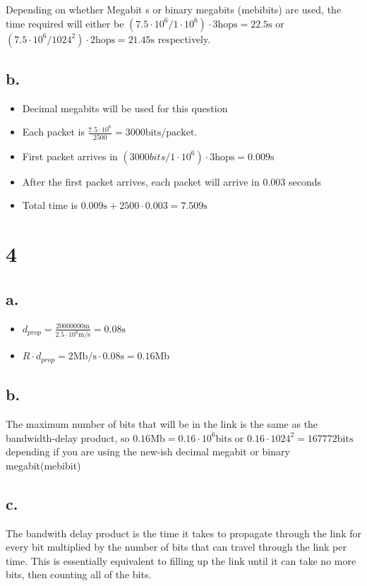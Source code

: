 \documentclass[11pt]{article}
\begin{document}
Depending on whether Megabit s or binary megabits (mebibits) are used, the time
required will either be \((7.5 \cdot 10^6 / 1 \cdot 10^6) \cdot 3 \text{hops} = 22.5 \text{s}\) or \((7.5 \cdot 10^6
/ 1024^2) \cdot 2 \text{hops}  = 21.45 \text{s}\) respectively.
\subsection*{b.}
\label{sec:org41a3917}
\begin{itemize}
\item Decimal megabits will be used for this question
\item Each packet is \(\frac{7.5 \cdot 10^6}{2500} = 3000\text{bits/packet}\).
\item First packet arrives in \((3000bits/1 \cdot 10^6) \cdot 3 \text{hops} = 0.009 \text{s}\)
\item After the first packet arrives, each packet will arrive in 0.003 seconds
\item Total time is \(0.009\text{s} + 2500 \cdot 0.003 = 7.509 \text{s}\)
\end{itemize}

\section*{4}
\label{sec:org394f764}
\subsection*{a.}
\label{sec:org7bfdf1a}
\begin{itemize}
\item \(d_{prop} = \frac{20000000 \text{m}}{2.5 \cdot 10^8 \text{m/s}} = 0.08 \text{s}\)
\item \(R \cdot d_{prop} = 2 \text{Mb/s} \cdot 0.08 \text{s} = 0.16 \text{Mb}\)
\end{itemize}
\subsection*{b.}
\label{sec:org77cae34}
The maximum number of bits that will be in the link is the same as the
bandwidth-delay product, so \(0.16 \text{Mb} = 0.16 \cdot 10^6 \text{bits}\) or
\(0.16 \cdot 1024^2 = 167772 \text{bits}\)  depending if you are using the new-ish
decimal megabit or binary megabit(mebibit)

\subsection*{c.}
\label{sec:orgc758d0e}
The bandwith delay product is the time it takes to propagate through the
link for every bit multiplied by the number of bits that can travel
through the link per time. This is essentially equivalent to filling up the
link until it can take no more bits, then counting all of the bits.
\end{document}
